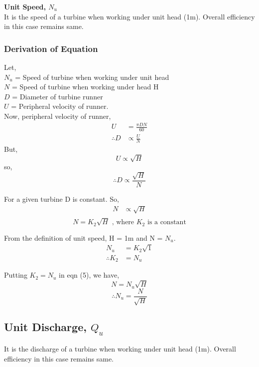 \documentclass{article}
\begin{document}
    \begin{multicols}{2}
      \textbf{Unit Speed, $N_u$}\\
      It is the speed of a turbine when working under unit head (1m). Overall efficiency in this case remains same. 

      \subsubsection*{Derivation of Equation}
      Let,\\
      $N_u$ = Speed of turbine when working under unit head \\
      $N$ = Speed of turbine when working under head H \\
      $D$ = Diameter of turbine runner \\
      $U$ = Peripheral velocity of runner.\\

      Now, peripheral velocity of runner,
      \begin{align*}
        U &= \frac{\pi D N}{60} \\
        \therefore D &\propto \frac{U}{N} 
      \end{align*}
      But, $$U \propto \sqrt{H}$$
      so, $$\therefore D \propto \frac{\sqrt{H}}{N}$$

      For a given turbine D is constant. So,
      \begin{align*}
        N &\propto \sqrt{H} \\
      \end{align*}
      \begin{equation}
        N = K_2 \sqrt{H} \text{ , where $K_2$ is a constant}
      \end{equation}

      From the definition of unit speed, H = 1m and N = $N_u$.
      \begin{align*}
        N_u &= K_2 \sqrt{1} \\
        \therefore K_2 &= N_u
      \end{align*}

      Putting $K_2 = N_u$ in eqn (5), we have,
      $$N = N_u \sqrt{H}$$
      $$\therefore N_u = \frac{N}{\sqrt{H}}$$


      \subsection*{Unit Discharge, $Q_u$}
      It is the discharge of a turbine when working under unit head (1m). Overall efficiency in this case remains same.


\end{multicols}
\end{document}
